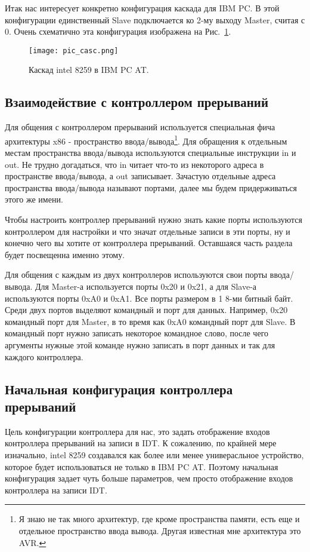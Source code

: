 Итак нас интересует конкретно конфигурация каскада для IBM PC. В этой
конфигурации единственный Slave подключается ко 2-му выходу Master, считая с 0.
Очень схематично эта конфигурация изображена на Рис.~\ref{fig:pic_casc}.

\begin{figure}
  \centering
  \texttt{[image: pic\_casc.png]}
  \caption{Каскад intel 8259 в IBM PC AT.}
  \label{fig:pic_casc}
\end{figure}

\subsection{Взаимодействие с контроллером прерываний}

Для общения с контроллером прерываний используется специальная фича архитектуры
x86 - пространство ввода/вывода\footnote{Я знаю не так много архитектур, где
кроме пространства памяти, есть еще и отдельное пространство ввода вывода.
Другая известная мне архитектура это AVR.}. Для обращения к отдельным местам
пространства ввода/вывода используются специальные инструкции in и out. Не
трудно догадаться, что in читает что-то из некоторого адреса в пространстве
ввода/вывода, а out записывает. Зачастую отдельные адреса пространства
ввода/вывода называют портами, далее мы будем придерживаться этого же имени.

Чтобы настроить контроллер прерываний нужно знать какие порты используются
контроллером для настройки и что значат отдельные записи в эти порты, ну и
конечно чего вы хотите от контроллера прерываний. Оставшаяся часть раздела
будет посвещенна именно этому.

Для общения с каждым из двух контроллеров используются свои порты ввода/вывода.
Для Master-а используется порты 0x20 и 0x21, а для Slave-а используются порты
0xA0 и 0xA1. Все порты размером в 1 8-ми битный байт. Среди двух портов выделяют
командный и порт для данных. Например, 0x20 командный порт для Master, в то
время как 0xA0 командный порт для Slave. В командный порт нужно записать
некоторое командное слово, после чего аргументы нужные этой команде нужно
записать в порт данных и так для каждого контроллера.

\subsection{Начальная конфигурация контроллера прерываний}

Цель конфигурации контроллера для нас, это задать отображение входов контроллера
прерываний на записи в IDT. К сожалению, по крайней мере изначально, intel 8259
создавался как более или менее универасльное устройство, которое будет
использоваться не только в IBM PC AT. Поэтому начальная конфигурация задает
чуть больше параметров, чем просто отображение входов контроллера на записи IDT.

